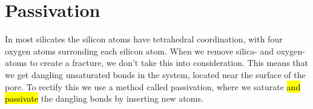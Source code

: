 %



\section{Passivation}
In most silicates the silicon atoms have tetrahedral coordination, with four oxygen atoms surronding each silicon atom. When we remove silica- and oxygen-atoms to create a fracture, we don't take this into consideration. This means that we get dangling unsaturated bonds in the system, located near the surface of the pore. To rectify this we use a method called passivation, where we saturate \hl{and passivate} the dangling bonds by inserting new atoms. 

